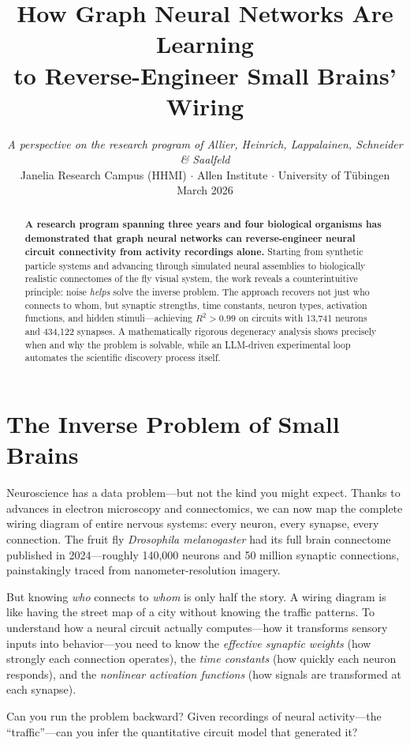 \documentclass[11pt,twocolumn]{article}
\title{\vspace{-1cm}\textbf{\color{quantablue}How Graph Neural Networks Are Learning\\[2pt] to Reverse-Engineer Small Brains' Wiring}}
\author{%
\textit{A perspective on the research program of Allier, Heinrich, Lappalainen, Schneider \& Saalfeld}\\[2pt]
\small Janelia Research Campus (HHMI) $\cdot$ Allen Institute $\cdot$ University of T\"ubingen\\[6pt]
\small\color{gray} March 2026%
}
\date{}
\begin{document}
\maketitle
\thispagestyle{fancy}

\begin{abstract}
\noindent
\textbf{A research program spanning three years and four biological organisms has demonstrated that graph neural networks can reverse-engineer neural circuit connectivity from activity recordings alone.} Starting from synthetic particle systems and advancing through simulated neural assemblies to biologically realistic connectomes of the fly visual system, the work reveals a counterintuitive principle: noise \emph{helps} solve the inverse problem. The approach recovers not just who connects to whom, but synaptic strengths, time constants, neuron types, activation functions, and hidden stimuli---achieving $R^2 > 0.99$ on circuits with 13,741 neurons and 434,122 synapses. A mathematically rigorous degeneracy analysis shows precisely when and why the problem is solvable, while an LLM-driven experimental loop automates the scientific discovery process itself.
\end{abstract}

\section{The Inverse Problem of Small Brains}

Neuroscience has a data problem---but not the kind you might expect. Thanks to advances in electron microscopy and connectomics, we can now map the complete wiring diagram of entire nervous systems: every neuron, every synapse, every connection. The fruit fly \textit{Drosophila melanogaster} had its full brain connectome published in 2024---roughly 140,000 neurons and 50 million synaptic connections, painstakingly traced from nanometer-resolution imagery.

But knowing \emph{who} connects to \emph{whom} is only half the story. A wiring diagram is like having the street map of a city without knowing the traffic patterns. To understand how a neural circuit actually computes---how it transforms sensory inputs into behavior---you need to know the \emph{effective synaptic weights} (how strongly each connection operates), the \emph{time constants} (how quickly each neuron responds), and the \emph{nonlinear activation functions} (how signals are transformed at each synapse).

Can you run the problem backward? Given recordings of neural activity---the ``traffic''---can you infer the quantitative circuit model that generated it?
\end{document}
